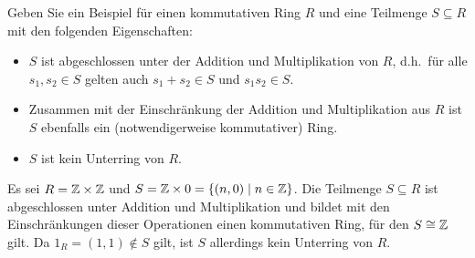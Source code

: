 \begin{question}[subtitle = Zur Definition von Unterringen]
  Geben Sie ein Beispiel für einen kommutativen Ring $R$ und eine Teilmenge $S \subseteq R$ mit den folgenden Eigenschaften:
  \begin{itemize}
    \item
      $S$ ist abgeschlossen unter der Addition und Multiplikation von $R$, d.h.\ für alle $s_1, s_2 \in S$ gelten auch $s_1 + s_2 \in S$ und $s_1 s_2 \in S$.
    \item
      Zusammen mit der Einschränkung der Addition und Multiplikation aus $R$ ist $S$ ebenfalls ein (notwendigerweise kommutativer) Ring.
    \item
      $S$ ist kein Unterring von $R$.
  \end{itemize}
\end{question}


\begin{solution}
  Es sei $R = \mathbb{Z} \times \mathbb{Z}$ und $S = \mathbb{Z} \times 0 = \{(n,0) \mid n \in \mathbb{Z}\}$.
  Die Teilmenge $S \subseteq R$ ist abgeschlossen unter Addition und Multiplikation und bildet mit den Einschränkungen dieser Operationen einen kommutativen Ring, für den $S \cong \mathbb{Z}$ gilt.
  Da $1_R = (1,1) \notin S$ gilt, ist $S$ allerdings kein Unterring von $R$.
\end{solution}



